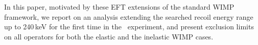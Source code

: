In this paper, motivated by these EFT extensions of the standard WIMP framework, we report on an analysis extending the searched recoil energy range up to 240\,keV for the first time in the \Xehund\ experiment, and present exclusion limits on all operators for both the elastic and the inelastic WIMP cases.     



